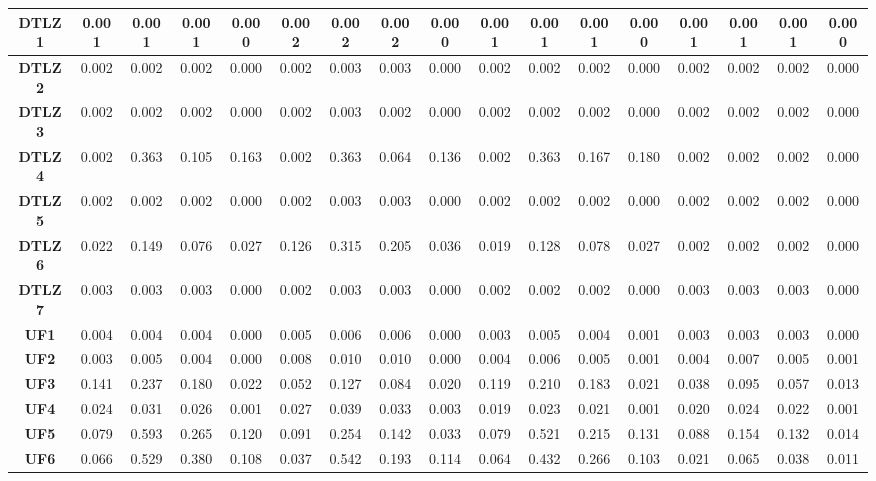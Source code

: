 \begin{table*}[t]
\begin{tabular}{cc|c|c|c|c|c|c|c|c|c|c|c|c|c|c|c}
\multicolumn{1}{c|}{\textbf{DTLZ1}} & 0.001 & 0.001 & 0.001 & 0.000 & 0.002 & 0.002 & 0.002 & 0.000 & 0.001 & 0.001 & 0.001 & 0.000 & 0.001 & 0.001 & 0.001 & 0.000 \\ \hline
\multicolumn{1}{c|}{\textbf{DTLZ2}} & 0.002 & 0.002 & 0.002 & 0.000 & 0.002 & 0.003 & 0.003 & 0.000 & 0.002 & 0.002 & 0.002 & 0.000 & 0.002 & 0.002 & 0.002 & 0.000 \\ \hline
\multicolumn{1}{c|}{\textbf{DTLZ3}} & 0.002 & 0.002 & 0.002 & 0.000 & 0.002 & 0.003 & 0.002 & 0.000 & 0.002 & 0.002 & 0.002 & 0.000 & 0.002 & 0.002 & 0.002 & 0.000 \\ \hline
\multicolumn{1}{c|}{\textbf{DTLZ4}} & 0.002 & 0.363 & 0.105 & 0.163 & 0.002 & 0.363 & 0.064 & 0.136 & 0.002 & 0.363 & 0.167 & 0.180 & 0.002 & 0.002 & 0.002 & 0.000 \\ \hline
\multicolumn{1}{c|}{\textbf{DTLZ5}} & 0.002 & 0.002 & 0.002 & 0.000 & 0.002 & 0.003 & 0.003 & 0.000 & 0.002 & 0.002 & 0.002 & 0.000 & 0.002 & 0.002 & 0.002 & 0.000 \\ \hline
\multicolumn{1}{c|}{\textbf{DTLZ6}} & 0.022 & 0.149 & 0.076 & 0.027 & 0.126 & 0.315 & 0.205 & 0.036 & 0.019 & 0.128 & 0.078 & 0.027 & 0.002 & 0.002 & 0.002 & 0.000 \\ \hline
\multicolumn{1}{c|}{\textbf{DTLZ7}} & 0.003 & 0.003 & 0.003 & 0.000 & 0.002 & 0.003 & 0.003 & 0.000 & 0.002 & 0.002 & 0.002 & 0.000 & 0.003 & 0.003 & 0.003 & 0.000 \\ \hline
\multicolumn{1}{c|}{\textbf{UF1}} & 0.004 & 0.004 & 0.004 & 0.000 & 0.005 & 0.006 & 0.006 & 0.000 & 0.003 & 0.005 & 0.004 & 0.001 & 0.003 & 0.003 & 0.003 & 0.000 \\ \hline
\multicolumn{1}{c|}{\textbf{UF2}} & 0.003 & 0.005 & 0.004 & 0.000 & 0.008 & 0.010 & 0.010 & 0.000 & 0.004 & 0.006 & 0.005 & 0.001 & 0.004 & 0.007 & 0.005 & 0.001 \\ \hline
\multicolumn{1}{c|}{\textbf{UF3}} & 0.141 & 0.237 & 0.180 & 0.022 & 0.052 & 0.127 & 0.084 & 0.020 & 0.119 & 0.210 & 0.183 & 0.021 & 0.038 & 0.095 & 0.057 & 0.013 \\ \hline
\multicolumn{1}{c|}{\textbf{UF4}} & 0.024 & 0.031 & 0.026 & 0.001 & 0.027 & 0.039 & 0.033 & 0.003 & 0.019 & 0.023 & 0.021 & 0.001 & 0.020 & 0.024 & 0.022 & 0.001 \\ \hline
\multicolumn{1}{c|}{\textbf{UF5}} & 0.079 & 0.593 & 0.265 & 0.120 & 0.091 & 0.254 & 0.142 & 0.033 & 0.079 & 0.521 & 0.215 & 0.131 & 0.088 & 0.154 & 0.132 & 0.014 \\ \hline
\multicolumn{1}{c|}{\textbf{UF6}} & 0.066 & 0.529 & 0.380 & 0.108 & 0.037 & 0.542 & 0.193 & 0.114 & 0.064 & 0.432 & 0.266 & 0.103 & 0.021 & 0.065 & 0.038 & 0.011 \\ \hline

\end{tabular}
\end{table*}
